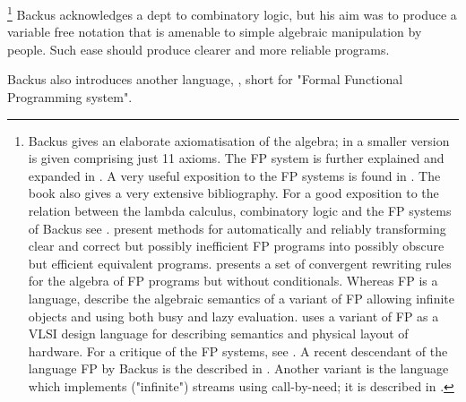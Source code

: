 \footnote{
Backus gives an elaborate axiomatisation of the algebra;
in  a smaller version is given
comprising just 11 axioms.
The FP system is further explained and expanded in
.
A very useful exposition to the FP systems is found in
.
The book also gives a very extensive bibliography.
For a good exposition to the
relation between the lambda calculus, combinatory logic
and the FP systems of Backus see
.
present methods for automatically and reliably
transforming clear and correct
but possibly inefficient FP programs
into possibly obscure but efficient equivalent programs.
presents a set of convergent rewriting rules
for the algebra of FP programs but without conditionals.
Whereas FP is a  language,
describe the algebraic semantics of a  variant of FP
allowing infinite objects
and using both busy and lazy evaluation.
uses a variant of FP as a VLSI design language
for describing semantics and physical layout of hardware.
For a critique of the FP systems, see
.
A recent descendant of the language FP by Backus
is the  described in
.
Another variant is the language 
which implements ("infinite") streams
using call-by-need;
it is described in
.
}
Backus acknowledges a dept to combinatory logic,
but his aim was to produce a variable free notation
that is amenable to simple algebraic manipulation by people.
Such ease should produce clearer and more reliable programs.
\par
Backus also introduces another language,
, short for "Formal Functional Programming system".
